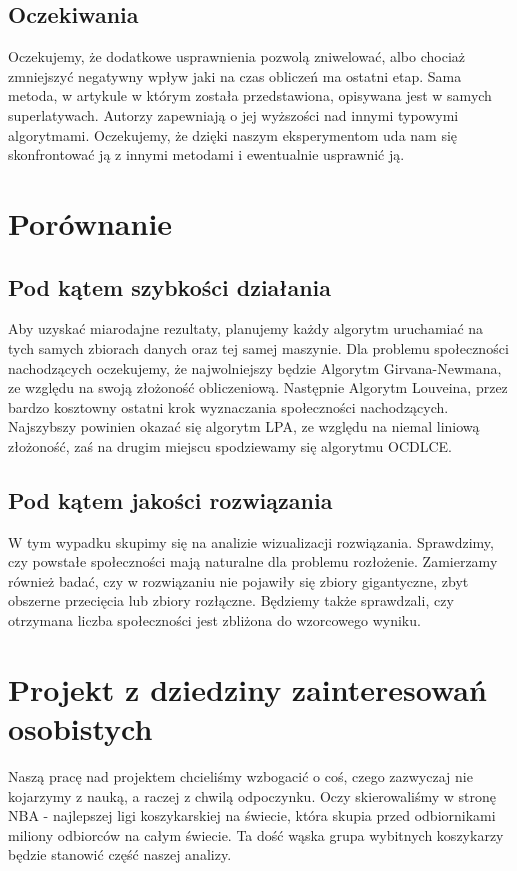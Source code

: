\documentclass{article}
\begin{document}
\subsection{Oczekiwania}
Oczekujemy, że dodatkowe usprawnienia pozwolą zniwelować, albo chociaż zmniejszyć negatywny wpływ jaki na czas obliczeń ma ostatni etap. 
Sama metoda, w artykule w którym została przedstawiona, opisywana jest w samych superlatywach. Autorzy zapewniają o jej wyższości nad innymi typowymi algorytmami. Oczekujemy, że dzięki naszym eksperymentom uda nam się skonfrontować ją z innymi metodami i ewentualnie usprawnić ją.

\newpage
\section{Porównanie}
\subsection{Pod kątem szybkości działania}
Aby uzyskać miarodajne rezultaty, planujemy każdy algorytm uruchamiać na tych samych zbiorach danych oraz tej samej maszynie. Dla problemu społeczności nachodzących oczekujemy, że najwolniejszy będzie Algorytm Girvana-Newmana, ze względu na swoją złożoność obliczeniową. Następnie Algorytm Louveina, przez bardzo kosztowny ostatni krok wyznaczania społeczności nachodzących. Najszybszy powinien okazać się algorytm LPA, ze względu na niemal liniową złożoność, zaś na drugim miejscu spodziewamy się algorytmu OCDLCE.

\subsection{Pod kątem jakości rozwiązania}
W tym wypadku skupimy się na analizie wizualizacji rozwiązania. Sprawdzimy, czy powstałe społeczności mają naturalne dla problemu rozłożenie. Zamierzamy również badać, czy w rozwiązaniu nie pojawiły się zbiory gigantyczne, zbyt obszerne przecięcia  lub zbiory rozłączne. Będziemy także sprawdzali, czy otrzymana liczba społeczności jest zbliżona do wzorcowego wyniku.

\newpage
\section{Projekt z dziedziny zainteresowań osobistych}
Naszą pracę nad projektem chcieliśmy wzbogacić o coś, czego zazwyczaj nie kojarzymy z nauką, a raczej z chwilą odpoczynku. Oczy skierowaliśmy w stronę NBA - najlepszej ligi koszykarskiej na świecie, która skupia przed odbiornikami miliony odbiorców na całym świecie. Ta dość wąska grupa wybitnych koszykarzy będzie stanowić część naszej analizy.
\end{document}
